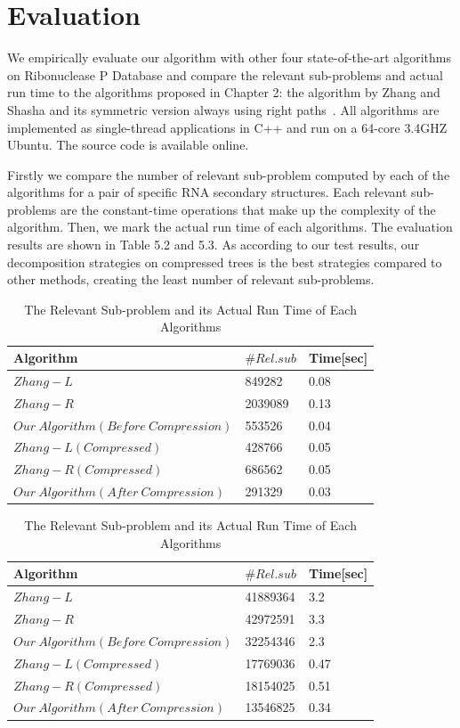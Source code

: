 \section{Evaluation}
We empirically evaluate our algorithm with other four state-of-the-art algorithms on Ribonuclease P Database and compare the relevant sub-problems and actual run time to the algorithms proposed in Chapter 2: the algorithm by Zhang and Shasha and its symmetric version always using right paths~\cite{zhang1989simple}. All algorithms are implemented as single-thread applications in C++ and run on a 64-core 3.4GHZ Ubuntu. The source code is available online.

Firstly we compare the number of relevant sub-problem computed by each of the algorithms for a pair of specific RNA secondary structures. Each relevant sub-problems are the constant-time operations that make up the complexity of the algorithm. Then, we mark the actual run time of each algorithms. The evaluation results are shown in Table 5.2 and 5.3. As according to our test results, our decomposition strategies on compressed trees is the best strategies compared to other methods, creating the least number of relevant sub-problems. 

\begin{table}
			\centering
			\begin{tabular}{l l l}
				\toprule
				\textbf{Algorithm} & \textbf{$\#Rel.sub$} &\textbf{Time[sec]}\\
				\midrule
				$Zhang-L$ & 849282 & 0.08\\
				$Zhang-R$ & 2039089 & 0.13\\
				$Our\ Algorithm(Before\ Compression)$ & 553526 & 0.04\\
				$Zhang-L(Compressed)$ & 428766 & 0.05\\
				$Zhang-R(Compressed)$ & 686562 & 0.05\\
				$Our\ Algorithm(After\ Compression)$ & 291329 & 0.03\\
			\end{tabular}
		\caption{The Relevant Sub-problem and its Actual Run Time of Each Algorithms}
\end{table}

\begin{table}
			\centering
			\begin{tabular}{l l l}
				\toprule
				\textbf{Algorithm} & \textbf{$\#Rel.sub$} &\textbf{Time[sec]}\\
				\midrule
				$Zhang-L$ & 41889364 & 3.2\\
				$Zhang-R$ & 42972591 & 3.3\\
				$Our\ Algorithm(Before\ Compression)$ & 32254346 & 2.3\\
				$Zhang-L(Compressed)$ & 17769036 & 0.47\\
				$Zhang-R(Compressed)$ & 18154025 & 0.51\\
				$Our\ Algorithm(After\ Compression)$ & 13546825 & 0.34\\
			\end{tabular}
		\caption{The Relevant Sub-problem and its Actual Run Time of Each Algorithms}
\end{table}




